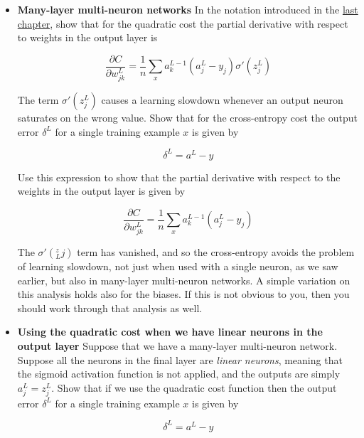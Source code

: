 \documentclass[a4paper,11pt,twoside]{report}
\begin{document}
\begin{itemize}
\item \textbf{Many-layer multi-neuron networks}
In the notation introduced in the \hyperref[chap: backpropagation]{last chapter}, show that for the quadratic cost the partial derivative with respect to weights in the output layer is

\begin{equation}
\frac{\partial C}{\partial w_{jk}^L}=\frac{1}{n}\sum_x a^{L-1}_k\left(a_j^L-y_j\right)\sigma'(z_j^L)
\label{eq: partial derivative quadr cost with resp w}
\end{equation}

The term $\sigma'(z^L_j)$ causes a learning slowdown whenever an output neuron saturates on the wrong value. Show that for the cross-entropy cost the output error $\delta^L$ for a single training example $x$ is given by

\begin{equation}
\delta^L=a^L-y
\label{eq: error on delta for cross-entropy}
\end{equation}

Use this expression to show that the partial derivative with respect to the weights in the output layer is given by

\begin{equation}
\frac{\partial C}{\partial w_{jk}^L}=\frac{1}{n}\sum_x a^{L-1}_k\left(a_j^L-y_j\right)
\label{eq: partial derivative cross-entrpy cost with resp w}
\end{equation}

The $\sigma'(^z_Lj)$ term has vanished, and so the cross-entropy avoids the problem of learning slowdown, not just when used with a single neuron, as we saw earlier, but also in many-layer multi-neuron networks. A simple variation on this analysis holds also for the biases. If this is not obvious to you, then you should work through that analysis as well.

\item \textbf{Using the quadratic cost when we have linear neurons in the output layer}
Suppose that we have a many-layer multi-neuron network. Suppose all the neurons in the final layer are \textit{linear neurons}, meaning that the sigmoid activation function is not applied, and the outputs are simply $a^L_j=z^L_j$. Show that if we use the quadratic cost function then the output error $\delta^L$ for a single training example $x$ is given by

\begin{equation}
\delta^L=a^L-y
\label{eq: error on delta for quadratic cost for linear neurons}
\end{equation}


\end{itemize}
\end{document}
